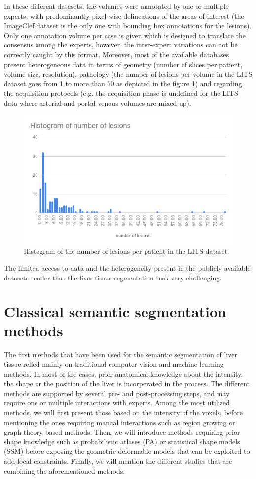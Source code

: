 \documentclass[]{article}
\begin{document}
In these different datasets, the volumes were annotated by one or
multiple experts, with predominantly pixel-wise delineations of the
areas of interest (the ImageClef dataset is the only one with bounding
box annotations for the lesions). Only one annotation volume per case is
given which is designed to translate the consensus among the experts,
however, the inter-expert variations can not be correctly caught by this
format. Moreover, most of the available databases present heterogeneous
data in terms of geometry (number of slices per patient, volume size,
resolution), pathology (the number of lesions per volume in the LITS
dataset goes from 1 to more than 70 as depicted in the figure \ref{NumberOfLesionsLits}) and regarding the
acquisition protocols (e.g. the acquisition phase is undefined for the
LITS data where arterial and portal venous volumes are mixed up).\\
\begin{figure}[!h]
	\centering
	\includegraphics[width=0.7\linewidth]{images/image11}
	\caption{Histogram of the number of lesions per patient in the LITS dataset}
	\label{NumberOfLesionsLits}
\end{figure}
The limited access to data and the heterogeneity present in the publicly
available datasets render thus the liver tissue segmentation task very
challenging.

\section*{Classical semantic segmentation methods}

The first methods that have been used for the semantic segmentation of
liver tissue relied mainly on traditional computer vision and machine
learning methods. In most of the cases, prior anatomical knowledge about
the intensity, the shape or the position of the liver is incorporated in
the process. The different methods are supported by several pre- and
post-processing steps, and may require one or multiple interactions with
experts.
Among the most utilized methods, we will first present those based on
the intensity of the voxels, before mentioning the ones requiring manual
interactions such as region growing or graph-theory based methods. Then,
we will introduce methods requiring prior shape knowledge such as
probabilistic atlases (PA) or statistical shape models (SSM) before
exposing the geometric deformable models that can be exploited to add
local constraints.
Finally, we will mention the different studies that are combining the
aforementioned methods.
\end{document}
